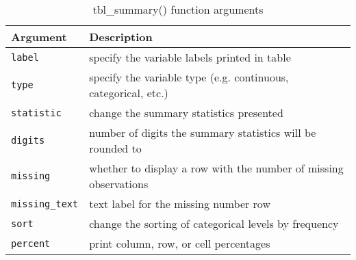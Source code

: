 \captionsetup[table]{labelformat=empty,skip=1pt}
\begin{longtable}{ll}
\caption{\label{tab:}tbl_summary() function arguments}\\
\toprule
Argument & Description \\ 
\midrule
\texttt{label} & specify the variable labels printed in table \\ 
\texttt{type} & specify the variable type (e.g. continuous, categorical, etc.) \\ 
\texttt{statistic} & change the summary statistics presented \\ 
\texttt{digits} & number of digits the summary statistics will be rounded to \\ 
\texttt{missing} & whether to display a row with the number of missing observations \\ 
\texttt{missing\_text} & text label for the missing number row \\ 
\texttt{sort} & change the sorting of categorical levels by frequency \\ 
\texttt{percent} & print column, row, or cell percentages \\ 
\bottomrule
\end{longtable}

